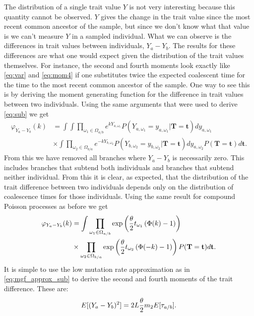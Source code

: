 The distribution of a single trait value $Y$ is not very interesting because
this quantity cannot be observed. $Y$ gives the change in the trait value since
the most recent common ancestor of the sample, but since we don't know what that
value is we can't measure $Y$ in a sampled individual. What we can observe is
the differences in trait values between individuals, $Y_a-Y_b$. The results for
these differences are what one would expect given the distribution of the trait
values themselves. For instance, the second and fourth moments look exactly like
\eqref{eq:var} and \eqref{eq:mom4} if one substitutes twice the expected
coalescent time for the time to the most recent common ancestor of the sample.
One way to see this is by deriving the moment generating function for the
difference in trait values between two individuals. Using the same arguments 
that were used to derive \eqref{eq:sub} we get
\begin{align}
  \varphi_{Y_a-Y_b}(k) &= \int \int \prod_{\omega_1 \in \Omega_{a/b}}
                         e^{kY_{a,\omega_1}}P(Y_{a,\omega_1}=y_{a,\omega_1}|\mathbf{T}=\mathbf{t})dy_{a,\omega_1} \nonumber \\
  &\times \int \prod_{\omega_2 \in \Omega_{b/a}}
                         e^{-kY_{b,\omega_2}}P(Y_{b,\omega_2}=y_{b,\omega_2}|\mathbf{T}=\mathbf{t})dy_{a,\omega_2}
    P(\mathbf{T}=\mathbf{t})d\mathbf{t}.
\end{align}
From this we have removed all branches where $Y_a-Y_b$ is necessarily zero. This
includes branches that subtend both individuals and branches that subtend
neither individual. From this it is clear, as expected, that the distribution of
the trait difference between two individuals depends only on the distribution of
coalescence times for those individuals. Using the same result for compound
Poisson processes as before we get
\begin{align}
  \varphi_{Y_a-Y_b}(k) &= \int \prod_{\omega_1 \in \Omega_{a/b}} 
                         \exp\left( \frac{\theta}{2} t_{\omega_1} \left( \Phi(k) - 1\right) \right) \nonumber \\
                       &\times \prod_{\omega_2 \in \Omega_{b/a}} 
                         \exp\left( \frac{\theta}{2} t_{\omega_2} \left( \Phi(-k) - 1\right) \right) 
                         P(\mathbf{T}=\mathbf{t})d\mathbf{t}.
\end{align}
It is simple to use the low mutation rate approximation as in
\eqref{eq:mgf_approx_sub} to derive the second and fourth moments of the trait
difference. These are:
\begin{equation}
  E[(Y_a-Y_b)^2]=2L\frac{\theta}{2} m_2 E[\tau_{a/b}].
\end{equation}
